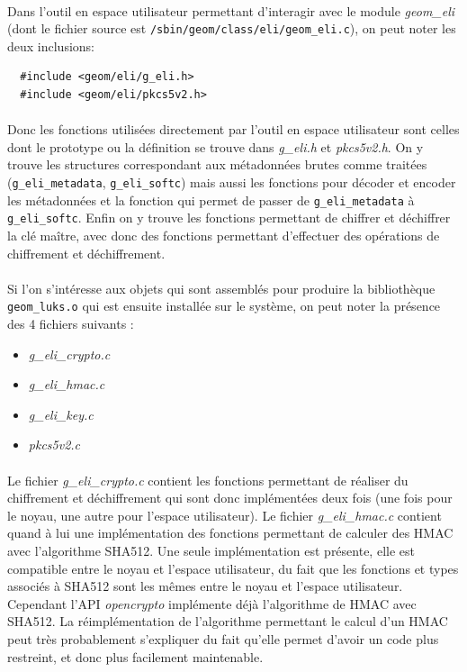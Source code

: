 \paragraph{}
Dans l'outil en espace utilisateur permettant d'interagir avec le module 
{\em geom\_eli} (dont le fichier source est
\texttt{/sbin/geom/class/eli/geom\_eli.c}), on peut noter les deux inclusions:
\begin{lstlisting}
  #include <geom/eli/g_eli.h>
  #include <geom/eli/pkcs5v2.h>
\end{lstlisting}

\paragraph{}
Donc les fonctions utilisées directement par l'outil en espace utilisateur sont
celles dont le prototype ou la définition se trouve dans {\em g\_eli.h} et
{\em pkcs5v2.h}. On y trouve les structures correspondant aux métadonnées brutes
comme traitées (\texttt{g\_eli\_metadata}, \texttt{g\_eli\_softc}) mais aussi
les fonctions pour décoder et encoder les métadonnées et la fonction qui permet
de passer de \texttt{g\_eli\_metadata} à \texttt{g\_eli\_softc}. Enfin on y
trouve les fonctions  permettant de chiffrer et déchiffrer la clé maître, avec
donc des fonctions permettant d'effectuer des opérations de chiffrement et
déchiffrement.

\paragraph{}
Si l'on s'intéresse aux objets qui sont assemblés pour produire la bibliothèque
\texttt{geom\_luks.o} qui est ensuite installée sur le système, on peut noter la
présence des 4 fichiers suivants :
\begin{itemize}
\item {\em g\_eli\_crypto.c}
\item {\em g\_eli\_hmac.c}
\item {\em g\_eli\_key.c}
\item {\em pkcs5v2.c}
\end{itemize}

\paragraph{}
Le fichier {\em g\_eli\_crypto.c} contient les fonctions permettant de réaliser
du chiffrement et déchiffrement qui sont donc implémentées deux fois (une fois
pour le noyau, une autre pour l'espace utilisateur). Le fichier
{\em g\_eli\_hmac.c} contient quand à lui une implémentation des fonctions
permettant de calculer des HMAC avec l'algorithme SHA512. Une seule implémentation
est présente, elle est compatible entre le noyau et l'espace utilisateur, du fait
que les fonctions et types associés à SHA512 sont les mêmes entre le noyau et
l'espace utilisateur.
Cependant l'API {\em opencrypto} implémente déjà l'algorithme de HMAC avec SHA512.
La réimplémentation de l'algorithme permettant le calcul d'un HMAC peut très
probablement s'expliquer du fait qu'elle permet d'avoir un code plus restreint,
et donc plus facilement maintenable.

